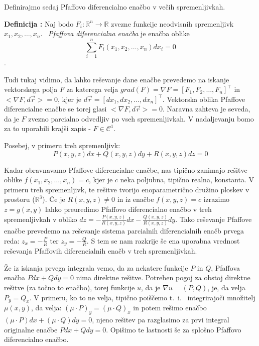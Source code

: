\documentclass[a4paper, 10pt]{article}
\newcounter{defcount}
\newenvironment{definicija}{\begin{flushleft}\refstepcounter{defcount}\textbf{Definicija \arabic{defcount}:}}{\hfill\end{flushleft}}
\newcommand{\mth}[1]{\ensuremath{\mathbb{#1}}}
\newcommand{\R}{\mth{R}}
\newcommand{\pojem}[1]{\emph{#1}}
\newcommand{\map}[3]{\ensuremath{{#1}: {#2} \rightarrow {#3}}}
\begin{document}
			Definirajmo sedaj Pfaffovo diferencialno enačbo v večih spremenljivkah.
			
			\begin{definicija}
				Naj bodo $\map{F_i}{\R^n}{\R}$ zvezne funkcije neodvisnih spremenljivk $x_1, x_2, \ldots, x_n$. ~\pojem{Pfaffova diferencialna enačba} je enačba oblike $$\sum_{i = 1}^{n}F_i(x_1, x_2, \ldots, x_n) dx_i = 0$$.
			\end{definicija}
			
			Tudi tukaj vidimo, da lahko reševanje dane enačbe prevedemo na iskanje vektorskega polja $F$ za katerega velja $grad(F) = \nabla F = [F_1, F_2, \ldots, F_n]^\top$ in $<\nabla F , d\vec{r}> = 0$, kjer je $d\vec{r} = [dx_1, dx_2, \ldots, dx_n]^\top$. Vektorska oblika Pfaffove diferencialne enačbe se torej glasi $<\nabla F, d\vec{r}> = 0$. Naravna zahteva je seveda, da je $F$ zvezno parcialno odvedljiv po vseh spremenljivkah. V nadaljevanju bomo za to uporabili krajši zapis - $F\in \mathcal{C}^1$.
			
			Posebej, v primeru treh spremenljivk: $$P(x, y, z)dx + Q(x, y, z)dy + R(x, y, z)dz = 0$$
			
			Kadar obravnavamo Pfaffove diferencialne enačbe, nas tipično zanimajo rešitve oblike $f(x_1, x_2, \ldots, x_n) = c$, kjer je $c$ neka poljubna, tipično realna, konstanta. V primeru treh spremenljivk, te rešitve tvorijo enoparametrično družino ploskev v prostoru ($\R^3$). Če je $R(x, y, z)\neq 0$ in iz enačbe $f(x, y, z) = c$ izrazimo $z = g(x, y)$ lahko preuredimo Pfaffovo diferencialno enačbo v treh spremenljivkah v obliko $dz = -\frac{P(x, y, z)}{R(x, y, z)}dx - \frac{Q(x, y, z)}{R(x, y, z)}dy$. Tako reševanje Pfaffove enačbe prevedemo na reševanje sistema parcialnih diferencialnih enačb prvega reda: $z_x = -\frac{P}{R}$ ter $z_y = -\frac{Q}{R}$. S tem se nam razkrije še ena uporabna vrednost reševanja Pfaffovih diferencialnih enačb v treh spremenljivkah.
			
			Že iz iskanja prvega integrala vemo, da za nekatere funkcije $P$ in $Q$, Pfaffova enačba $Pdx + Qdy = 0$ nima direktne rešitve. Potreben pogoj za obstoj direktne rešitve (za točno to enačbo), torej funkcije $u$, da je $\nabla u = (P, Q)$, je, da velja $P_y = Q_x$. V primeru, ko to ne velja, tipično poiščemo t.~i.~ integrirajoči množitelj $\mu(x, y)$, da velja: $(\mu\cdot P)_y = (\mu\cdot Q)_x$ in potem rešimo enačbo $(\mu\cdot P)dx + (\mu\cdot Q)dy = 0$, njeno rešitev pa razglasimo za prvi integral originalne enačbe $Pdx + Qdy = 0$. Opišimo te lastnosti še za splošno Pfaffovo diferencialno enačbo.
			
\end{document}
